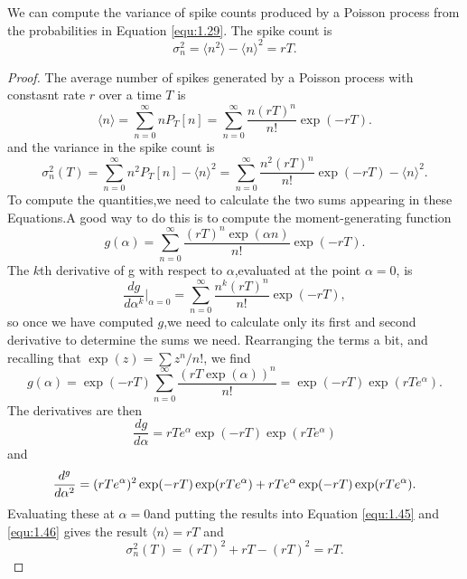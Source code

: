 \begin{coro}
    We can compute the variance of spike counts produced by a Poisson process from the probabilities in Equation \ref{equ:1.29}. The spike count is 
    \begin{equation}
        \sigma^2_n = \langle n^2 \rangle -\langle n  \rangle ^2=rT.
    \end{equation}
    \begin{proof}
    The average number of spikes generated by a Poisson process with constasnt rate $r$ over a time $T$ is 
    \begin{equation}
        \langle n\rangle=\sum_{n=0}^\infty nP_T[n]=\sum_{n=0}^\infty\frac{n(rT)^n}{n!}\exp(-rT).
        \label{equ:1.45}
    \end{equation}
    and the variance in the spike count is
    \begin{equation}
        \sigma_n^2(T)=\sum_{n=0}^\infty n^2P_T[n]-\langle n\rangle^2=\sum_{n=0}^\infty\frac{n^2(rT)^n}{n!}\exp(-rT)-\langle n\rangle^2.
        \label{equ:1.46}
        \end{equation}
        To compute the quantities,we need to calculate the two sums appearing in these Equations.A good way to do this is to compute the moment-generating function
        \begin{equation}
            g(\alpha)=\sum_{n=0}^\infty\frac{(rT)^n\exp(\alpha n)}{n!}\exp(-rT).
            \label{equ:1.47}
        \end{equation}      
        The $k$th derivative of g with respect to $\alpha$,evaluated at the point $\alpha=0$, is
        \begin{equation}
            \frac{dg}{d\alpha^k}|_{\alpha=0}=\sum_{n=0}^\infty\frac{n^k(rT)^n}{n!}\exp(-rT),
            \label{equ:1.48}
        \end{equation}        
    so once we have computed $g$,we need to calculate only its first and second derivative to determine the sums we need. Rearranging the terms a bit, and recalling that $\exp(z)=\sum z^n/n!$, we find\\        
    \begin{equation}
        g(\alpha)=\exp(-rT)\sum_{n=0}^\infty\frac{(rT\exp(\alpha))^n}{n!}=\exp(-rT)\exp(rTe^\alpha).
        \label{equ:1.49}
    \end{equation}
    The derivatives are then \\
    \begin{equation}
        \frac{dg}{d\alpha}=rTe^\alpha \exp(-rT)\exp(rTe^\alpha)
        \label{equ:1.50}
    \end{equation}
    and\\
    \begin{equation}
    \small    \frac{d^g}{d\alpha^2}=(rTe^\alpha)^2\exp(-rT)\exp(rTe^\alpha)+rTe^\alpha \exp(-rT)\exp(rTe^\alpha).
        \label{equ:1.51}
    \end{equation}
    Evaluating these at $\alpha=0$and putting the results into Equation \ref{equ:1.45} and \ref{equ:1.46} gives the result $\langle n\rangle=rT$ and $$\sigma_n^2(T)=(rT)^2+rT-(rT)^2=rT.$$
    \end{proof}
\end{coro}

